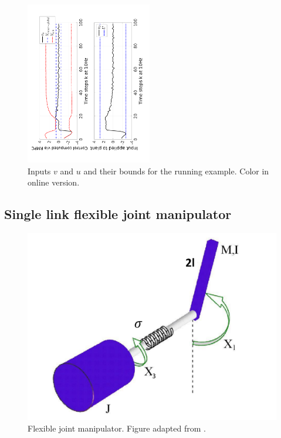 \begin{figure}
	\centering	
	\includegraphics[angle=270,width=0.49\textwidth]{figs/u_and_v_toy.pdf}
	\caption{Inputs $v$ and $u$ and their bounds for the running example. Color in online version.}
	\label{fig:input toy}
\end{figure}


\subsection{Single link flexible joint manipulator}
\label{sec:manipulator}

\begin{figure}
	\centering
	\includegraphics[scale=0.2]{figs/ManipArm.pdf}
	\caption{Flexible joint manipulator. Figure adapted from \cite{intech}.}
	\label{fig:manipulator fig}
\end{figure}

